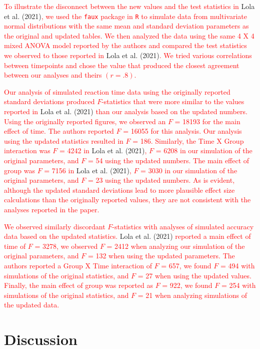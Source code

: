\documentclass[
  english,
  man, donotrepeattitle,floatsintext]{apa7}
\begin{document}
\textcolor{red}{To illustrate the disconnect between the new values and the test statistics in} Lola et al. (2021)\textcolor{red}{, we used the \texttt{faux} package in \texttt{R} to simulate data from multivariate normal distributions with the same mean and standard deviation parameters as the original and updated tables. We then analyzed the data using the same 4 X 4 mixed ANOVA model reported by the authors and compared the test statistics we observed to those reported in} Lola et al. (2021)\textcolor{red}{. We tried various correlations between timepoints and chose the value that produced the closest agreement between our analyses and theirs $(r = .8)$.}

\textcolor{red}{Our analysis of simulated reaction time data using the originally reported standard deviations produced $F$-statistics that were more similar to the values reported in} Lola et al. (2021) \textcolor{red}{than our analysis based on the updated numbers. Using the originally reported figures, we observed an $F$ = 18193 for the main effect of time. The authors reported $F$ = 16055 for this analysis. Our analysis using the updated statistics resulted in $F$ = 186. Similarly, the Time X Group interaction was $F$ = 4242 in} Lola et al. (2021)\textcolor{red}{, $F$ = 6208 in our simulation of the original parameters, and $F$ = 54 using the updated numbers. The main effect of group was $F$ = 7156 in} Lola et al. (2021)\textcolor{red}{, $F$ = 3030 in our simulation of the original parameters, and $F$ = 23 using the updated numbers. As is evident, although the updated standard deviations lead to more plausible effect size calculations than the originally reported values, they are not consistent with the analyses reported in the paper.}

\textcolor{red}{We observed similarly discordant $F$-statistics with analyses of simulated accuracy data based on the updated statistics.} Lola et al. (2021) \textcolor{red}{reported a main effect of time of $F$ = 3278, we observed $F$ = 2412 when analyzing our simulation of the original parameters, and $F$ = 132 when using the updated parameters. The authors reported a Group X Time interaction of $F$ = 657, we found $F$ = 494 with simulations of the original statistics, and $F$ = 27 when using the updated values. Finally, the main effect of group was reported as $F$ = 922, we found $F$ = 254 with simulations of the original statistics, and $F$ = 21 when analyzing simulations of the updated data.}

\hypertarget{discussion}{%
\section{Discussion}\label{discussion}}
\end{document}
